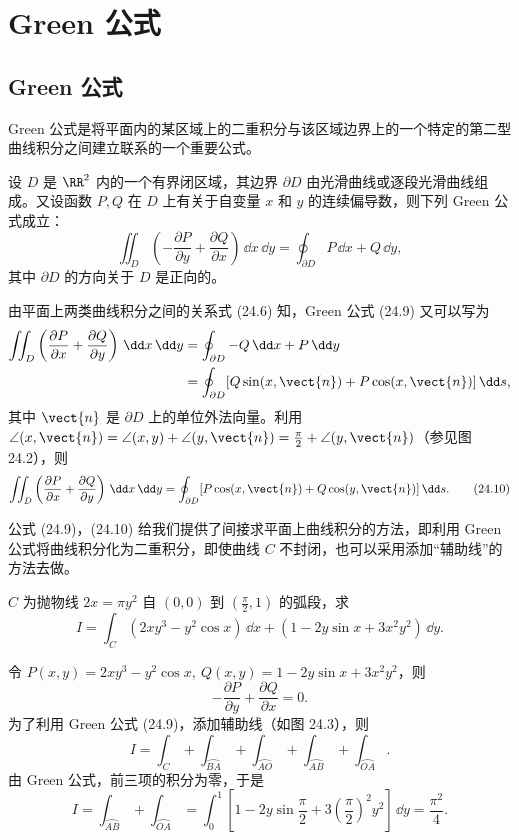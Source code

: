 \section{Green 公式}

\subsection{Green 公式}

Green 公式是将平面内的某区域上的二重积分与该区域边界上的一个特定的第二型曲线积分之间建立联系的一个重要公式。

设 $D$ 是 $\RR^2$ 内的一个有界闭区域，其边界 $\partial D$ 由光滑曲线或逐段光滑曲线组成。又设函数 $P,Q$ 在 $D$ 上有关于自变量 $x$ 和 $y$ 的连续偏导数，则下列 Green 公式成立：
\begin{equation}
  \iint_D\left(-\frac{\partial P}{\partial y}+\frac{\partial Q}{\partial x}\right)\,\dd x\,\dd y
  =\oint_{\partial D}P\,\dd x+Q\,\dd y,
  \tag{24.9}
  \label{eq:24.9}
\end{equation}
其中 $\partial D$ 的方向关于 $D$ 是正向的。

由平面上两类曲线积分之间的关系式 (24.6) 知，Green 公式 (24.9) 又可以写为
\begin{align*}
  \iint_D\left(\frac{\partial P}{\partial x}+\frac{\partial Q}{\partial y}\right)\,\dd x\,\dd y
  &=\oint_{\partial D}-Q\,\dd x+P\,\dd y\\
  &=\oint_{\partial D}[Q\sin(x,\vect{n})+P\cos(x,\vect{n})]\,\dd s,
\end{align*}
其中 $\vect{n}$ 是 $\partial D$ 上的单位外法向量。利用 $\angle(x,\vect{n})=\angle(x,y)+\angle(y,\vect{n})=\frac\pi2+\angle(y,\vect{n})$（参见图 24.2），则
\begin{equation}
  \iint_D\left(\frac{\partial P}{\partial x}+\frac{\partial Q}{\partial y}\right)\,\dd x\,\dd y
  =\oint_{\partial D}[P\cos(x,\vect{n})+Q\cos(y,\vect{n})]\,\dd s.
  \tag{24.10}
  \label{eq:24.10}
\end{equation}

公式 (24.9)，(24.10) 给我们提供了间接求平面上曲线积分的方法，即利用 Green 公式将曲线积分化为二重积分，即使曲线 $C$ 不封闭，也可以采用添加“辅助线”的方法去做。

\begin{xexample}[24.3.1]
$C$ 为抛物线 $2x=\pi y^2$ 自 $(0,0)$ 到 $(\frac\pi2,1)$ 的弧段，求
\[
  I=\int_C(2xy^3-y^2\cos x)\,\dd x+(1-2y\sin x+3x^2y^2)\,\dd y.
\]
\end{xexample}
\begin{xsolution}
令 $P(x,y)=2xy^3-y^2\cos x,\ Q(x,y)=1-2y\sin x+3x^2y^2$，则
\[
  -\frac{\partial P}{\partial y}+\frac{\partial Q}{\partial x}=0.
\]
为了利用 Green 公式 (24.9)，添加辅助线（如图 24.3），则
\[
  I=\int_C+\int_{\wideparen{BA}}+\int_{\wideparen{AO}}+\int_{\wideparen{AB}}+\int_{\wideparen{OA}}.
\]
由 Green 公式，前三项的积分为零，于是
\[
  I=\int_{\wideparen{AB}}+\int_{\wideparen{OA}}
  =\int_0^1\left[1-2y\sin\frac\pi2+3\left(\frac\pi2\right)^2y^2\right]\,\dd y
  =\frac{\pi^2}{4}.
\]
\end{xsolution}

